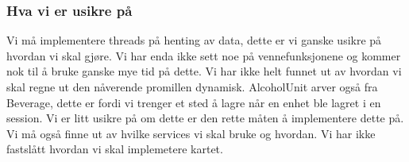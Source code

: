 \subsubsection{Hva vi er usikre på}
Vi må implementere threads på henting av data, dette er vi ganske usikre på hvordan vi skal gjøre.
Vi har enda ikke sett noe på vennefunksjonene og kommer nok til å bruke ganske mye tid på dette.
Vi har ikke helt funnet ut av hvordan vi skal regne ut den nåverende promillen dynamisk.
AlcoholUnit arver også fra Beverage, dette er fordi vi trenger et sted å lagre når en enhet ble lagret i en session. Vi er litt usikre på om dette er den rette måten å implementere dette på.  
Vi må også finne ut av hvilke services vi skal bruke og hvordan.
Vi har ikke fastslått hvordan vi skal implemetere kartet.
